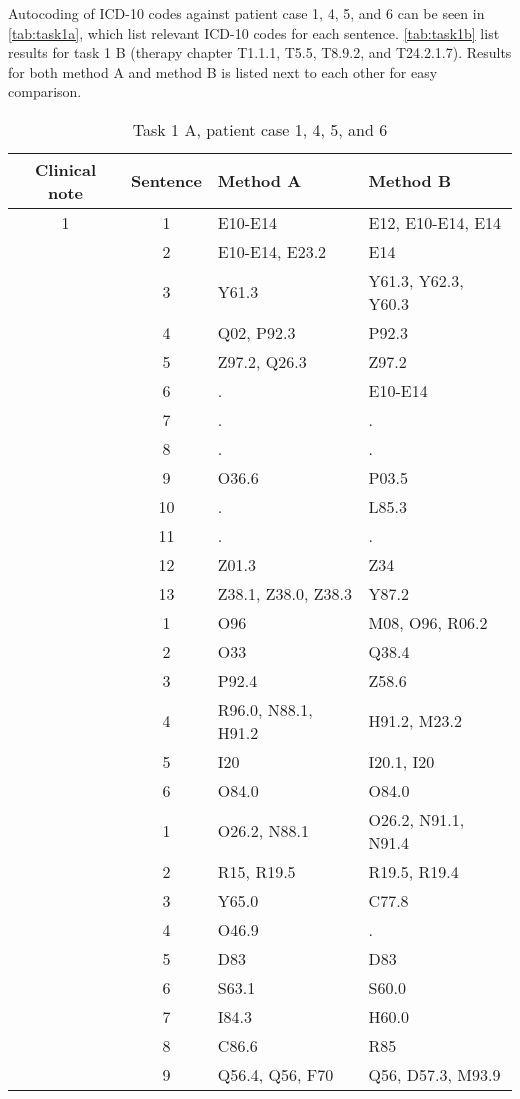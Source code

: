 Autocoding of ICD-10 codes against patient case 1, 4, 5, and 6 can be seen in
\autoref{tab:task1a}, which list relevant ICD-10 codes for each sentence.
\autoref{tab:task1b} list results for task 1 B (therapy chapter T1.1.1, T5.5,
T8.9.2, and T24.2.1.7). Results for both method A and method B is listed next
to each other for easy comparison.
\begin{table}[htbp] \footnotesize \center
\caption{Task 1 A, patient case 1, 4, 5, and 6\label{tab:task1a}}
\begin{tabular}{c c l l}
    \toprule
    Clinical note & Sentence & Method A & Method B \\
    \midrule
	1 & 1 & E10-E14 & E12, E10-E14, E14 \\
	 & 2 & E10-E14, E23.2 & E14 \\
	 & 3 & Y61.3 & Y61.3, Y62.3, Y60.3 \\
	 & 4 & Q02, P92.3 & P92.3 \\
	 & 5 & Z97.2, Q26.3 & Z97.2 \\
	 & 6 & . & E10-E14 \\
	 & 7 & . & . \\
	 & 8 & . & . \\
	 & 9 & O36.6 & P03.5 \\
	 & 10 & . & L85.3 \\
	 & 11 & . & . \\
	 & 12 & Z01.3 & Z34 \\
	 & 13 & Z38.1, Z38.0, Z38.3 & Y87.2 \\
	\addlinespace
	4 & 1 & O96 & M08, O96, R06.2 \\
	 & 2 & O33 & Q38.4 \\
	 & 3 & P92.4 & Z58.6 \\
	 & 4 & R96.0, N88.1, H91.2 & H91.2, M23.2 \\
	 & 5 & I20 & I20.1, I20 \\
	 & 6 & O84.0 & O84.0 \\
	\addlinespace
	5 & 1 & O26.2, N88.1 & O26.2, N91.1, N91.4 \\
	 & 2 & R15, R19.5 & R19.5, R19.4 \\
	 & 3 & Y65.0 & C77.8 \\
	 & 4 & O46.9 & . \\
	 & 5 & D83 & D83 \\
	 & 6 & S63.1 & S60.0 \\
	 & 7 & I84.3 & H60.0 \\
	 & 8 & C86.6 & R85 \\
	 & 9 & Q56.4, Q56, F70 & Q56, D57.3, M93.9 \\

\end{tabular}
\end{table}
